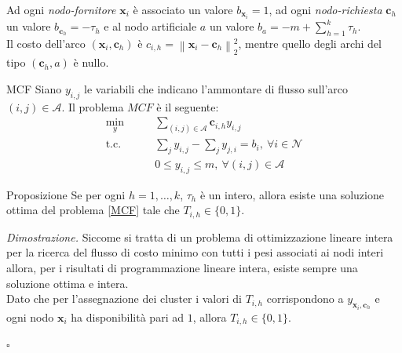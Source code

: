 \documentclass{beamer}
\begin{document}
\begin{frame}
	Ad ogni \textit{nodo-fornitore} $\textbf{x}_i$ è associato un valore $b_{\textbf{x}_i}=1$, ad ogni \textit{nodo-richiesta} $\textbf{c}_h$ un valore $b_{\textbf{c}_h}=-\tau_h$ e al nodo artificiale $a$ un valore $b_a = -m+\sum_{h=1}^k \tau_h$. \\
	Il costo dell'arco $(\textbf{x}_i, \textbf{c}_h)$ è $c_{i,h} = \left\| \textbf{x}_i - \textbf{c}_h \right\|^2_2 $, mentre quello degli archi del tipo $(\textbf{c}_h, a)$ è nullo.
	\begin{block}{MCF}
		Siano $y_{i,j}$ le variabili che indicano l'ammontare di flusso sull'arco $(i,j) \in \mathcal{A}$. Il problema $MCF$ è il seguente:
		\begin{equation} \label{MCF}
			\begin{split}
				\underset{y}{\text{min}} & \qquad \sum_{(i,j)\in\mathcal{A}} \textbf{c}_{i,h}y_{i,j}\\
				\text{t.c.} & \qquad \sum_{j} y_{i,j} - \sum_{j} y_{j,i} = b_i, \ \forall i \in \mathcal{N}\\
				& \qquad 0 \le y_{i,j} \le m, \ \forall (i,j) \in \mathcal{A}
			\end{split}
		\end{equation}
	\vspace{-0.5cm}
	\end{block}
\end{frame}
\begin{frame}
	\begin{exampleblock}{Proposizione}
		Se per ogni $h=1,\dots,k$, $\tau_h$ è un intero, allora esiste una soluzione ottima del problema \eqref{MCF} tale che $T_{i,h} \in \{0,1\}$.
	\end{exampleblock}
	\textit{Dimostrazione.} 
	Siccome si tratta di un problema di ottimizzazione lineare intera per la ricerca del flusso di costo minimo con tutti i pesi associati ai nodi interi allora, per i risultati di programmazione lineare intera, esiste sempre una soluzione ottima e intera. \\
	Dato che per l'assegnazione dei cluster i valori di $ T_{i,h} $ corrispondono a $ y_{\textbf{x}_i, \textbf{c}_h} $ e ogni nodo $ \textbf{x}_i $ ha disponibilità pari ad $ 1 $, allora $ T_{i,h} \in \{0,1\} $.\vspace{-0.5cm}\begin{flushright}$ \square $\end{flushright}
\end{frame}
\end{document}
